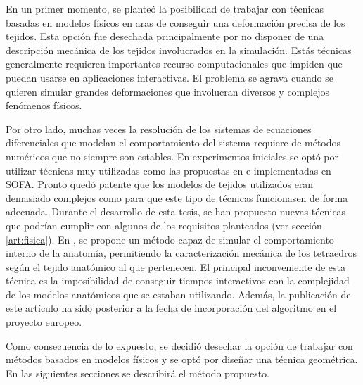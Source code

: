 En un primer momento, se planteó la posibilidad de trabajar con técnicas basadas en modelos físicos en aras de conseguir una deformación precisa de los tejidos. Esta opción fue desechada\new{,} principalmente por no disponer de una descripción mecánica de los tejidos involucrados en la simulación. Estás técnicas generalmente requieren importantes recurso computacionales que impiden que puedan usarse en aplicaciones interactivas. El problema se agrava cuando se quieren simular grandes deformaciones que involucran diversos y complejos fenómenos físicos.

Por otro lado, muchas veces la resolución de los sistemas de ecuaciones diferenciales que modelan el comportamiento del sistema requiere de métodos numéricos que no siempre son estables. En experimentos iniciales\new{,} se optó por utilizar técnicas muy utilizadas como las propuestas en  \cite{Muller2004} e implementadas en \ac{SOFA}. Pronto quedó patente que los modelos de tejidos utilizados eran demasiado complejos como para que este tipo de técnicas funcionasen de forma adecuada.
Durante el desarrollo de esta tesis, se han propuesto nuevas técnicas que podrían cumplir con algunos de los requisitos planteados (ver sección \ref{art:fisica}). En \cite{abu2015position}, se propone un método capaz de simular el comportamiento interno de la anatomía, permitiendo la caracterización mecánica de los tetraedros según el tejido anatómico al que pertenecen.  
El principal inconveniente de esta técnica es\new{,} la imposibilidad de conseguir tiempos interactivos con la complejidad de los modelos anatómicos que se estaban utilizando. Además, la publicación de este artículo ha sido posterior a la fecha de incorporación del algoritmo en el proyecto europeo.

Como consecuencia de lo expuesto, se decidió desechar la opción de trabajar con métodos basados en modelos físicos y se optó por diseñar una técnica geométrica. En las siguientes secciones se describirá el método propuesto.